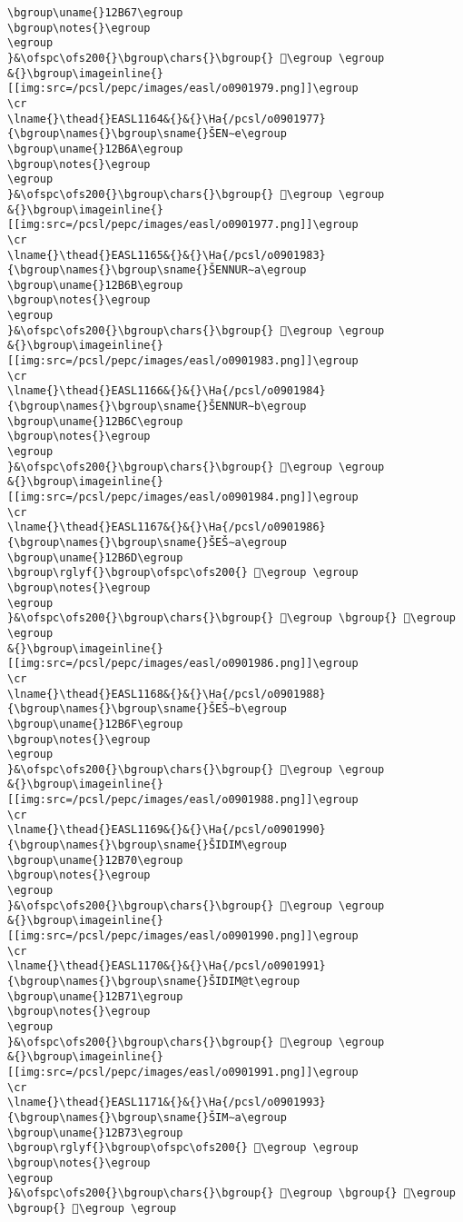 \begin{verbatim}
\bgroup\uname{}12B67\egroup
\bgroup\notes{}\egroup
\egroup
}&\ofspc\ofs200{}\bgroup\chars{}\bgroup{} 𒭧\egroup \egroup
&{}\bgroup\imageinline{}[[img:src=/pcsl/pepc/images/easl/o0901979.png]]\egroup
\cr
\lname{}\thead{}EASL1164&{}&{}\Ha{/pcsl/o0901977}{\bgroup\names{}\bgroup\sname{}ŠEN∼e\egroup
\bgroup\uname{}12B6A\egroup
\bgroup\notes{}\egroup
\egroup
}&\ofspc\ofs200{}\bgroup\chars{}\bgroup{} 𒭪\egroup \egroup
&{}\bgroup\imageinline{}[[img:src=/pcsl/pepc/images/easl/o0901977.png]]\egroup
\cr
\lname{}\thead{}EASL1165&{}&{}\Ha{/pcsl/o0901983}{\bgroup\names{}\bgroup\sname{}ŠENNUR∼a\egroup
\bgroup\uname{}12B6B\egroup
\bgroup\notes{}\egroup
\egroup
}&\ofspc\ofs200{}\bgroup\chars{}\bgroup{} 𒭫\egroup \egroup
&{}\bgroup\imageinline{}[[img:src=/pcsl/pepc/images/easl/o0901983.png]]\egroup
\cr
\lname{}\thead{}EASL1166&{}&{}\Ha{/pcsl/o0901984}{\bgroup\names{}\bgroup\sname{}ŠENNUR∼b\egroup
\bgroup\uname{}12B6C\egroup
\bgroup\notes{}\egroup
\egroup
}&\ofspc\ofs200{}\bgroup\chars{}\bgroup{} 𒭬\egroup \egroup
&{}\bgroup\imageinline{}[[img:src=/pcsl/pepc/images/easl/o0901984.png]]\egroup
\cr
\lname{}\thead{}EASL1167&{}&{}\Ha{/pcsl/o0901986}{\bgroup\names{}\bgroup\sname{}ŠEŠ∼a\egroup
\bgroup\uname{}12B6D\egroup
\bgroup\rglyf{}\bgroup\ofspc\ofs200{} 𒭭\egroup \egroup
\bgroup\notes{}\egroup
\egroup
}&\ofspc\ofs200{}\bgroup\chars{}\bgroup{} 𒭭\egroup \bgroup{} 𒭮\egroup \egroup
&{}\bgroup\imageinline{}[[img:src=/pcsl/pepc/images/easl/o0901986.png]]\egroup
\cr
\lname{}\thead{}EASL1168&{}&{}\Ha{/pcsl/o0901988}{\bgroup\names{}\bgroup\sname{}ŠEŠ∼b\egroup
\bgroup\uname{}12B6F\egroup
\bgroup\notes{}\egroup
\egroup
}&\ofspc\ofs200{}\bgroup\chars{}\bgroup{} 𒭯\egroup \egroup
&{}\bgroup\imageinline{}[[img:src=/pcsl/pepc/images/easl/o0901988.png]]\egroup
\cr
\lname{}\thead{}EASL1169&{}&{}\Ha{/pcsl/o0901990}{\bgroup\names{}\bgroup\sname{}ŠIDIM\egroup
\bgroup\uname{}12B70\egroup
\bgroup\notes{}\egroup
\egroup
}&\ofspc\ofs200{}\bgroup\chars{}\bgroup{} 𒭰\egroup \egroup
&{}\bgroup\imageinline{}[[img:src=/pcsl/pepc/images/easl/o0901990.png]]\egroup
\cr
\lname{}\thead{}EASL1170&{}&{}\Ha{/pcsl/o0901991}{\bgroup\names{}\bgroup\sname{}ŠIDIM@t\egroup
\bgroup\uname{}12B71\egroup
\bgroup\notes{}\egroup
\egroup
}&\ofspc\ofs200{}\bgroup\chars{}\bgroup{} 𒭱\egroup \egroup
&{}\bgroup\imageinline{}[[img:src=/pcsl/pepc/images/easl/o0901991.png]]\egroup
\cr
\lname{}\thead{}EASL1171&{}&{}\Ha{/pcsl/o0901993}{\bgroup\names{}\bgroup\sname{}ŠIM∼a\egroup
\bgroup\uname{}12B73\egroup
\bgroup\rglyf{}\bgroup\ofspc\ofs200{} 𒭳\egroup \egroup
\bgroup\notes{}\egroup
\egroup
}&\ofspc\ofs200{}\bgroup\chars{}\bgroup{} 𒭲\egroup \bgroup{} 𒭳\egroup \bgroup{} 𒭴\egroup \egroup

\end{verbatim}
